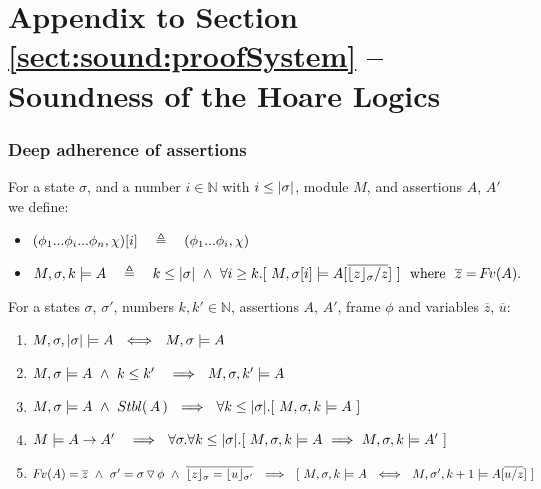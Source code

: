 \section{Appendix to Section \ref{sect:sound:proofSystem} -- Soundness of the Hoare Logics}

\subsubsection{Deep adherence of assertions}
\label{s:deep:mean}{

\begin{definition}%
\label{def:restrict}
For a state $\sigma$, and a number $i\in \mathbb{N}$ with $i \leq |\sigma|$,   module $M$, and assertions $A$, $A'$ we define: %
\begin{itemize}
\item
 $\RestictTo {(\phi_1...\phi_i...\phi_n,\chi)} {i}\ \ \ \triangleq \ \ \ (\phi_1...\phi_i,\chi)$
%
\item
$  \satDAssertFrom M  \sigma k   A  \ \  \ \triangleq \  \ \  
  k\leq  \DepthSt {\sigma} \ \wedge \  \forall i\geq k.[\ M,{\RestictTo {\sigma}{i}} \models A[\overline{ {{\interpret \sigma z}/ z}}]\ ] \ \  \mbox{where} \ \
  \overline z=\fv(A).$ 
\end{itemize}
\end{definition}
 
  
 
\begin{lemma}
\label{l:shallow:deep}
For a states $\sigma$, $\sigma'$, numbers $k,k'\in \mathbb{N}$, assertions  $A$, $A'$, frame $\phi$ and variables $\overline z$, $\overline u$:
\begin{enumerate}
\item
$ \satDAssertFrom M  \sigma { \DepthSt \sigma}   A \ \ \Longleftrightarrow\ \ M,\sigma \models A\ $
\item
$ M,\sigma \models A \ \wedge\  k\leq k'\  \  \   \Longrightarrow \ \ M,\sigma ,{k'} \models {A} $ 
\item 
\label{shallow:to:deep}
$ M,\sigma \models A \ \wedge\ \Stable A \  \ \Longrightarrow \  \  \forall k  \leq  \DepthSt \sigma.[ \ \satDAssertFrom M  \sigma k   A \ ]$
\item
\label{fourSD}
$ M  \models A \rightarrow A'\  \  \   \Longrightarrow \ \ \forall \sigma. \forall k\leq  { \DepthSt \sigma}.[ \ \satDAssertFrom M  \sigma {k} A
\ \Longrightarrow \  \satDAssertFrom M  \sigma {k} A'\ ]$
\item
\label{fiveSD}
$\fv(A)=\overline z\ \wedge\ \sigma'=\sigma  \pushSymbol \phi\ \wedge\   \overline {\interpret \sigma z= {\interpret {\sigma'} u}}\ \ \Longrightarrow\ \ 
[\ \satDAssertFrom M  \sigma {k} A  
\ \ \Longleftrightarrow \ \ \satDAssertFrom M  {\sigma'} {k+1} {A[{\overline{u/z}}]}\ ]$
\end{enumerate}
\end{lemma}
 

}
